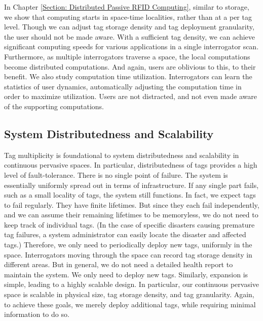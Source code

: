 In Chapter \ref{Section: Distributed Passive RFID Computing}, similar to storage, we show that computing starts in space-time localities, rather than at a per tag level. Though we can adjust tag storage density and tag deployment granularity, the user should not be made aware. With a sufficient tag density, we can achieve significant computing speeds for various applications in a single interrogator scan. Furthermore, as multiple interrogators traverse a space, the local computations become distributed computations. And again, users are oblivious to this, to their benefit. We also study computation time utilization. Interrogators can learn the statistics of user dynamics, automatically adjusting the computation time in order to maximize utilization. Users are not distracted, and not even made aware of the supporting computations.

\subsection{System Distributedness and Scalability}
Tag multiplicity is foundational to system distributedness and scalability in continuous pervasive spaces. In particular, distributedness of tags provides a high level of fault-tolerance. There is no single point of failure. The system is essentially uniformly spread out in terms of infrastructure. If any single part fails, such as a small locality of tags, the system still functions. In fact, we expect tags to fail regularly. They have finite lifetimes. But since they each fail independently, and we can assume their remaining lifetimes to be memoryless, we do not need to keep track of individual tags. (In the case of specific disasters causing premature tag failures, a system administrator can easily locate the disaster and affected tags.) Therefore, we only need to periodically deploy new tags, uniformly in the space. Interrogators moving through the space can record tag storage density in different areas. But in general, we do not need a detailed health report to maintain the system. We only need to deploy new tags. Similarly, expansion is simple, leading to a highly scalable design. In particular, our continuous pervasive space is scalable in physical size, tag storage density, and tag granularity. Again, to achieve these goals, we merely deploy additional tags, while requiring minimal information to do so.

